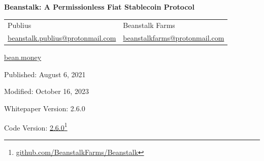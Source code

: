 \documentclass[tikz]{article}
\newcommand{\BeanCover}{} %
\begin{document}
\thispagestyle{empty} %
\begin{titlepage}
    \begin{center}
        \vspace*{-0.1cm}
        \begin{changemargin}{-0.25cm}{-0.25cm}
        \centering %
        \textbf{\Large{Beanstalk: A Permissionless Fiat Stablecoin Protocol}}
        \end{changemargin}
        \begin{center}
        \BeanCover
        \end{center}
        
        \vspace{0.4cm}
        \begin{center}
        \begin{tabular}{>{\centering\arraybackslash}p{6cm} >{\centering\arraybackslash}p{6cm}}
                \large{Publius} & \large{Beanstalk Farms} \\
                \href{mailto:beanstalk.publius@protonmail.com}{\normalsize{beanstalk.publius@protonmail.com}} & \href{mailto:beanstalkfarms@protonmail.com}{\normalsize{beanstalkfarms@protonmail.com}}
            \end{tabular}
        \end{center}
            
        
        \vspace{-0.25cm}
        \normalsize{\href{https://bean.money/}{bean.money}}
        
        \vspace{0.4cm}
        \footnotesize{Published:} \normalsize{August 6, 2021}
        
        \vspace{-0.25cm}
        \footnotesize{Modified:} \normalsize{October 16, 2023}
        
        \vspace{-0.25cm}
        \footnotesize{Whitepaper Version:} {\normalsize{2.6.0}}
        
        \vspace{-0.25cm}
        \footnotesize{Code Version:} \href{https://github.com/BeanstalkFarms/Beanstalk}{\normalsize{2.6.0}}\footnote{\href{https://github.com/BeanstalkFarms/Beanstalk}{github.com/BeanstalkFarms/Beanstalk}}
        


\end{center}
\end{titlepage}
\end{document}
